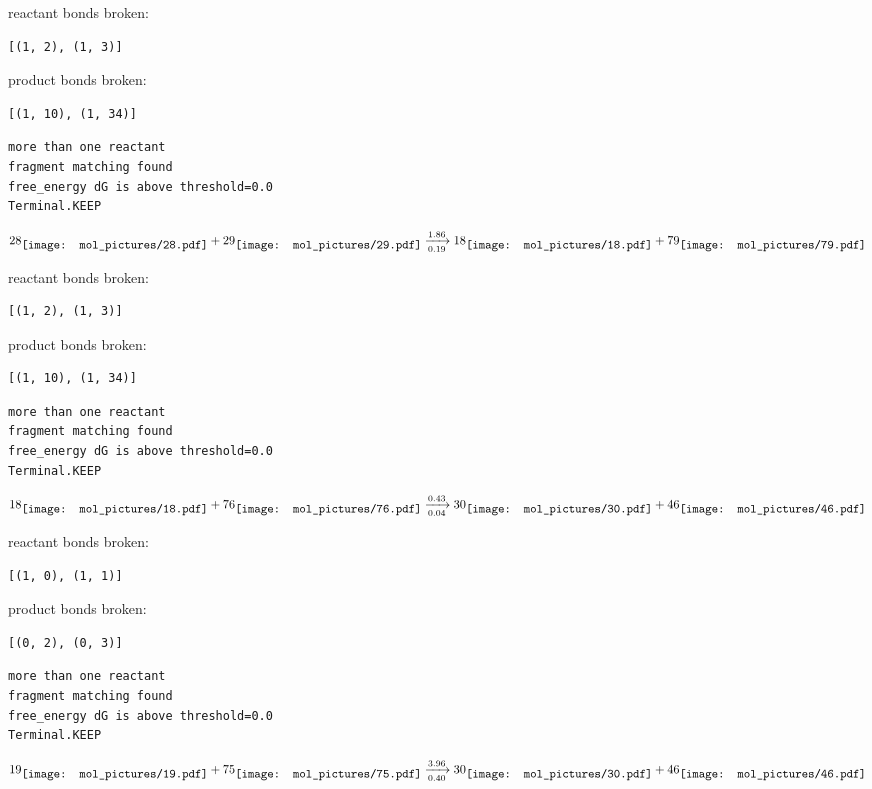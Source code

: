 \documentclass{article}
\begin{document}
reactant bonds broken:\begin{verbatim}
[(1, 2), (1, 3)]
\end{verbatim}
product bonds broken:\begin{verbatim}
[(1, 10), (1, 34)]
\end{verbatim}




\vspace{1cm}
\begin{verbatim}
more than one reactant
fragment matching found
free_energy dG is above threshold=0.0
Terminal.KEEP
\end{verbatim}
$$
28
\raisebox{-.5\height}{\texttt{[image: mol\_pictures/28.pdf]}}
+
29
\raisebox{-.5\height}{\texttt{[image: mol\_pictures/29.pdf]}}
\xrightarrow[0.19]{1.86}
18
\raisebox{-.5\height}{\texttt{[image: mol\_pictures/18.pdf]}}
+
79
\raisebox{-.5\height}{\texttt{[image: mol\_pictures/79.pdf]}}
$$


reactant bonds broken:\begin{verbatim}
[(1, 2), (1, 3)]
\end{verbatim}
product bonds broken:\begin{verbatim}
[(1, 10), (1, 34)]
\end{verbatim}




\vspace{1cm}
\begin{verbatim}
more than one reactant
fragment matching found
free_energy dG is above threshold=0.0
Terminal.KEEP
\end{verbatim}
$$
18
\raisebox{-.5\height}{\texttt{[image: mol\_pictures/18.pdf]}}
+
76
\raisebox{-.5\height}{\texttt{[image: mol\_pictures/76.pdf]}}
\xrightarrow[0.04]{0.43}
30
\raisebox{-.5\height}{\texttt{[image: mol\_pictures/30.pdf]}}
+
46
\raisebox{-.5\height}{\texttt{[image: mol\_pictures/46.pdf]}}
$$


reactant bonds broken:\begin{verbatim}
[(1, 0), (1, 1)]
\end{verbatim}
product bonds broken:\begin{verbatim}
[(0, 2), (0, 3)]
\end{verbatim}




\vspace{1cm}
\begin{verbatim}
more than one reactant
fragment matching found
free_energy dG is above threshold=0.0
Terminal.KEEP
\end{verbatim}
$$
19
\raisebox{-.5\height}{\texttt{[image: mol\_pictures/19.pdf]}}
+
75
\raisebox{-.5\height}{\texttt{[image: mol\_pictures/75.pdf]}}
\xrightarrow[0.40]{3.96}
30
\raisebox{-.5\height}{\texttt{[image: mol\_pictures/30.pdf]}}
+
46
\raisebox{-.5\height}{\texttt{[image: mol\_pictures/46.pdf]}}
$$
\end{document}
